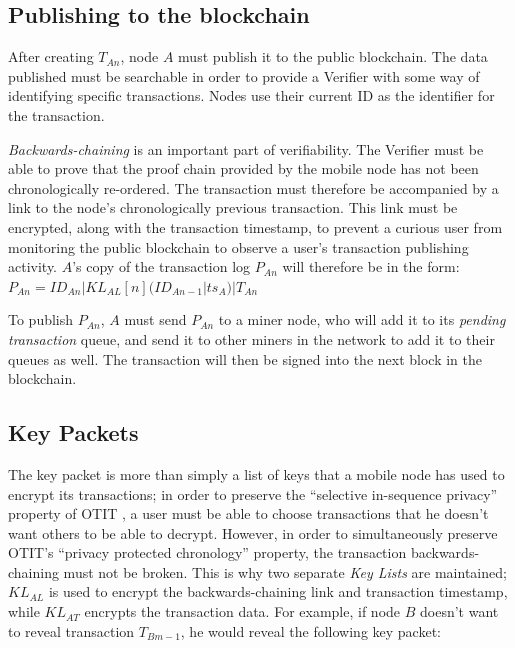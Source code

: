 \subsection{Publishing to the blockchain}
After creating $T_{An}$, node $A$ must publish it to the public blockchain. The data published must be searchable in order to provide a Verifier with some way of identifying specific transactions. Nodes use their current ID as the identifier for the transaction.

\textit{Backwards-chaining} is an important part of verifiability. The Verifier must be able to prove that the proof chain provided by the mobile node has not been chronologically re-ordered. The transaction must therefore be accompanied by a link to the node's chronologically previous transaction. This link must be encrypted, along with the transaction timestamp, to prevent a curious user from monitoring the public blockchain to observe a user's transaction publishing activity. $A$'s copy of the transaction log $P_{An}$ will therefore be in the form:
\\

$P_{An} = ID_{An}|KL_{AL}[n](ID_{An-1}|ts_A)|T_{An}$

\null
To publish $P_{An}$, $A$ must send $P_{An}$ to a miner node, who will add it to its \textit{pending transaction} queue, and send it to other miners in the network to add it to their queues as well. The transaction will then be signed into the next block in the blockchain.

\subsection{Key Packets} \label{sssec:key_packets}
The key packet is more than simply a list of keys that a mobile node has used to encrypt its transactions; in order to preserve the ``selective in-sequence privacy'' property of OTIT \cite{otit}, a user must be able to choose transactions that he doesn't want others to be able to decrypt. However, in order to simultaneously preserve OTIT's ``privacy protected chronology'' property, the transaction backwards-chaining must not be broken. This is why two separate \textit{Key Lists} are maintained; $KL_{AL}$ is used to encrypt the backwards-chaining link and transaction timestamp, while $KL_{AT}$ encrypts the transaction data. For example, if node $B$ doesn't want to reveal transaction $T_{Bm-1}$, he would reveal the following key packet:
\\

